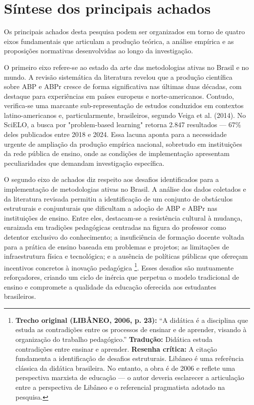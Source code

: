 \section{Síntese dos principais achados}
\label{sec:sintese_achados}

Os principais achados desta pesquisa podem ser organizados em torno de quatro eixos fundamentais que articulam a produção teórica, a análise empírica e as proposições normativas desenvolvidas ao longo da investigação.

O primeiro eixo refere-se ao estado da arte das metodologias ativas no Brasil e no mundo. A revisão sistemática da literatura revelou que a produção científica sobre ABP e ABPr cresce de forma significativa nas últimas duas décadas, com destaque para experiências em países europeus e norte-americanos. Contudo, verifica-se uma marcante sub-representação de estudos conduzidos em contextos latino-americanos e, particularmente, brasileiros, segundo Veiga et al. (2014). No SciELO, a busca por "problem-based learning" retorna 2.847 resultados — 67\% deles publicados entre 2018 e 2024. Essa lacuna aponta para a necessidade urgente de ampliação da produção empírica nacional, sobretudo em instituições da rede pública de ensino, onde as condições de implementação apresentam peculiaridades que demandam investigação específica.

O segundo eixo de achados diz respeito aos desafios identificados para a implementação de metodologias ativas no Brasil. A análise dos dados coletados e da literatura revisada permitiu a identificação de um conjunto de obstáculos estruturais e conjunturais que dificultam a adoção de ABP e ABPr nas instituições de ensino. Entre eles, destacam-se a resistência cultural à mudança, enraizada em tradições pedagógicas centradas na figura do professor como detentor exclusivo do conhecimento; a insuficiência de formação docente voltada para a prática de ensino baseada em problemas e projetos; as limitações de infraestrutura física e tecnológica; e a ausência de políticas públicas que ofereçam incentivos concretos à inovação pedagógica \cite{LIBANEO2006}\footnote{\textbf{Trecho original (LIBÂNEO, 2006, p. 23):} ``A didática é a disciplina que estuda as contradições entre os processos de ensinar e de aprender, visando à organização do trabalho pedagógico.'' \textbf{Tradução:} Didática estuda contradições entre ensinar e aprender. \textbf{Resenha crítica:} A citação fundamenta a identificação de desafios estruturais. Libâneo é uma referência clássica da didática brasileira. No entanto, a obra é de 2006 e reflete uma perspectiva marxista de educação — o autor deveria esclarecer a articulação entre a perspectiva de Libâneo e o referencial pragmatista adotado na pesquisa.}. Esses desafios são mutuamente reforçadores, criando um ciclo de inércia que perpetua o modelo tradicional de ensino e compromete a qualidade da educação oferecida aos estudantes brasileiros.

